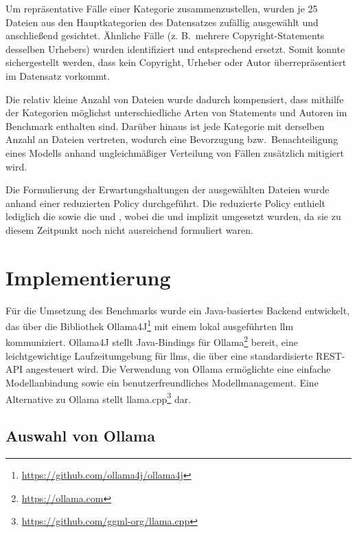 Um repräsentative Fälle einer Kategorie zusammenzustellen, wurden je \num{25} Dateien aus den Hauptkategorien des Datensatzes zufällig ausgewählt und anschließend gesichtet.
Ähnliche Fälle (z. B.\ mehrere Copyright-Statements desselben Urhebers) wurden identifiziert und entsprechend ersetzt.
Somit konnte sichergestellt werden, dass kein Copyright, Urheber oder Autor überrepräsentiert im Datensatz vorkommt.

Die relativ kleine Anzahl von Dateien wurde dadurch kompensiert, dass mithilfe der Kategorien möglichst unterschiedliche Arten von Statements und Autoren im Benchmark enthalten sind.
Darüber hinaus ist jede Kategorie mit derselben Anzahl an Dateien vertreten, wodurch eine Bevorzugung bzw.\ Benachteiligung eines Modells anhand ungleichmäßiger Verteilung von Fällen zusätzlich mitigiert wird.

Die Formulierung der Erwartungshaltungen der ausgewählten Dateien wurde anhand einer reduzierten Policy durchgeführt.
Die reduzierte Policy enthielt lediglich die  sowie die  und , wobei die  und  implizit umgesetzt wurden, da sie zu diesem Zeitpunkt noch nicht ausreichend formuliert waren.


\section{Implementierung}\label{sec:benchmark-implementierung}

Für die Umsetzung des Benchmarks wurde ein Java-basiertes Backend entwickelt, das über die Bibliothek Ollama4J\footnote{\url{https://github.com/ollama4j/ollama4j}} mit einem lokal ausgeführten \gls{llm} kommuniziert.
Ollama4J stellt Java-Bindings für Ollama\footnote{\url{https://ollama.com}} bereit, eine leichtgewichtige Laufzeitumgebung für \glspl{llm}, die über eine standardisierte REST-API angesteuert wird.
Die Verwendung von Ollama ermöglichte eine einfache Modellanbindung sowie ein benutzerfreundliches Modellmanagement.
Eine Alternative zu Ollama stellt llama.cpp\footnote{\url{https://github.com/ggml-org/llama.cpp}} dar.


\subsection{Auswahl von Ollama}\label{subsec:auswahl-von-ollama}

